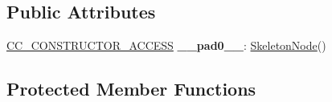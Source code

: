 \subsection*{Public Attributes}
\begin{DoxyCompactItemize}
\item 
\mbox{\label{classSkeletonNode_a72592b13d30c5c21be0dac2834f8fbbe}} 
\hyperlink{_2cocos2d_2cocos_2base_2ccConfig_8h_a25ef1314f97c35a2ed3d029b0ead6da0}{C\+C\+\_\+\+C\+O\+N\+S\+T\+R\+U\+C\+T\+O\+R\+\_\+\+A\+C\+C\+E\+SS} {\bfseries \+\_\+\+\_\+pad0\+\_\+\+\_\+}\+: \hyperlink{classSkeletonNode}{Skeleton\+Node}()
\end{DoxyCompactItemize}
\subsection*{Protected Member Functions}
